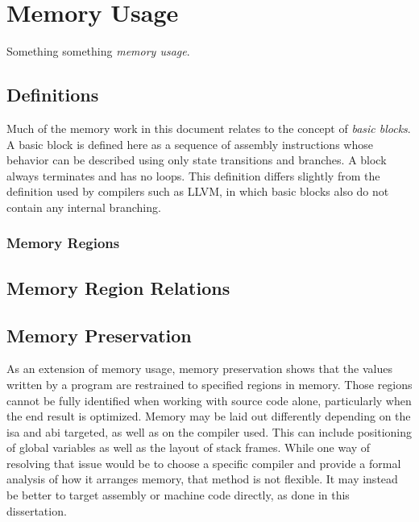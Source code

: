 \chapter{Memory Usage}\label{ch:memory}

Something something \emph{memory usage}.

\section{Definitions}
Much of the memory work in this document relates to the concept of \emph{basic blocks}.
A basic block is defined here as a sequence of assembly instructions
whose behavior can be described using only state transitions and branches.
A block always terminates and has no loops.
This definition differs slightly from the definition used by compilers such as LLVM,
in which basic blocks also do not contain any internal branching.

\subsection{Memory Regions}\label{sse:memory_regions}

\section{Memory Region Relations}

\section{Memory Preservation}\label{se:memory_preservation}
As an extension of memory usage,
memory preservation shows that the values written by a program
are restrained to specified regions in memory.
Those regions cannot be fully identified when working with source code alone,
particularly when the end result is optimized.
Memory may be laid out differently depending on the \ac{isa} and \ac{abi} targeted,
as well as on the compiler used.
This can include positioning of global variables as well as the layout of stack frames.
While one way of resolving that issue would be to choose a specific compiler
and provide a formal analysis of how it arranges memory, that method is not flexible.
It may instead be better to target assembly or machine code directly,
as done in this dissertation.

